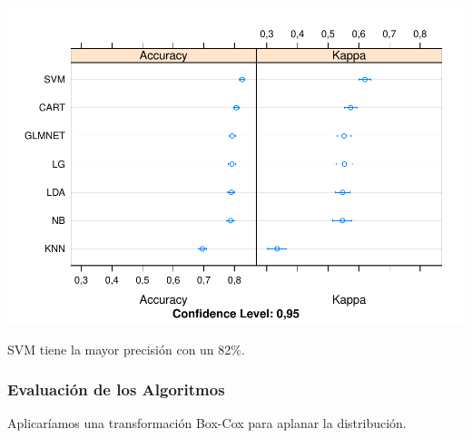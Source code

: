 \documentclass[]{article}
\begin{document}
\includegraphics{titanicDataClean_files/figure-latex/datasetTrain_compare_plot-1.pdf}

SVM tiene la mayor precisión con un 82\%.

\subsubsection{Evaluación de los
Algoritmos}\label{evaluacion-de-los-algoritmos}

Aplicaríamos una transformación Box-Cox para aplanar la distribución.
\end{document}
